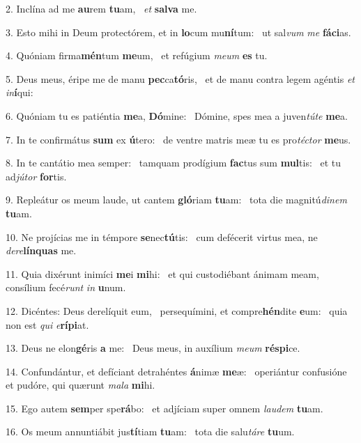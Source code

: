 2. Inclína ad me \textbf{au}rem \textbf{tu}am, \ast\  \textit{et} \textbf{sal}\textbf{va} me.\

3. Esto mihi in Deum protectórem, et in \textbf{lo}cum mu\textbf{ní}tum: \ast\  ut sal\textit{vum} \textit{me} \textbf{fá}\textbf{ci}as.\

4. Quóniam firma\textbf{mén}tum \textbf{me}um, \ast\  et refúgium \textit{me}\textit{um} \textbf{es} tu.\

5. Deus meus, éripe me de manu \textbf{pec}ca\textbf{tó}ris, \ast\  et de manu contra legem agéntis \textit{et} \textit{in}\textbf{í}qui:\

6. Quóniam tu es patiéntia \textbf{me}a, \textbf{Dó}mine: \ast\  Dómine, spes mea a juven\textit{tú}\textit{te} \textbf{me}a.\

7. In te confirmátus \textbf{sum} ex \textbf{ú}tero: \ast\  de ventre matris meæ tu es pro\textit{téc}\textit{tor} \textbf{me}us.\

8. In te cantátio mea semper: \dag\  tamquam prodígium \textbf{fac}tus sum \textbf{mul}tis: \ast\  et tu ad\textit{jú}\textit{tor} \textbf{for}tis.\

9. Repleátur os meum laude, ut cantem \textbf{gló}riam \textbf{tu}am: \ast\  tota die magnitú\textit{di}\textit{nem} \textbf{tu}am.\

10. Ne projícias me in témpore \textbf{se}nec\textbf{tú}tis: \ast\  cum defécerit virtus mea, ne \textit{de}\textit{re}\textbf{lín}\textbf{quas} me.\

11. Quia dixérunt inimíci \textbf{me}i \textbf{mi}hi: \ast\  et qui custodiébant ánimam meam, consílium fecé\textit{runt} \textit{in} \textbf{u}num.\

12. Dicéntes: Deus derelíquit eum, \dag\  persequímini, et compre\textbf{hén}dite \textbf{e}um: \ast\  quia non est \textit{qui} \textit{e}\textbf{rí}\textbf{pi}at.\

13. Deus ne elon\textbf{gé}ris \textbf{a} me: \ast\  Deus meus, in auxílium \textit{me}\textit{um} \textbf{ré}\textbf{spi}ce.\

14. Confundántur, et defíciant detrahéntes \textbf{á}nimæ \textbf{me}æ: \ast\  operiántur confusióne et pudóre, qui quærunt \textit{ma}\textit{la} \textbf{mi}hi.\

15. Ego autem \textbf{sem}per spe\textbf{rá}bo: \ast\  et adjíciam super omnem \textit{lau}\textit{dem} \textbf{tu}am.\

16. Os meum annuntiábit jus\textbf{tí}tiam \textbf{tu}am: \ast\  tota die salu\textit{tá}\textit{re} \textbf{tu}um.\

